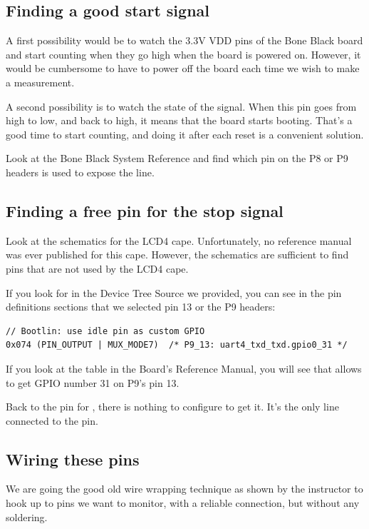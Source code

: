 \subsection{Finding a good start signal}

A first possibility would be to watch the 3.3V VDD pins of the Bone
Black board and start counting when they go high when the board is
powered on. However, it would be cumbersome to have to power off the
board each time we wish to make a measurement.

A second possibility is to watch the state of the  signal.
When this pin goes from high to low, and back to high, it means that the
board starts booting. That's a good time to start counting, and doing
it after each reset is a convenient solution.

Look at the Bone Black System Reference and find which pin on the P8 or
P9 headers is used to expose the  line.

\subsection{Finding a free pin for the stop signal}

Look at the schematics for the LCD4 cape. Unfortunately, no reference
manual was ever published for this cape. However, the schematics are
sufficient to find pins that are not used by the LCD4 cape.

If you look for  in the Device Tree Source we provided,
you can see in the pin definitions sections that we selected pin 13 or
the P9 headers:

\begin{verbatim}
// Bootlin: use idle pin as custom GPIO
0x074 (PIN_OUTPUT | MUX_MODE7)  /* P9_13: uart4_txd_txd.gpio0_31 */
\end{verbatim}

If you look at the  table in the
Board's Reference Manual, you will see that  allows to get
GPIO number 31 on P9's pin 13.

Back to the pin for , there is nothing to configure to
get it. It's the only line connected to the pin.

\subsection{Wiring these pins}

We are going the good old wire wrapping technique as shown by the
instructor to hook up to pins we want to monitor, with a reliable
connection, but without any soldering.

